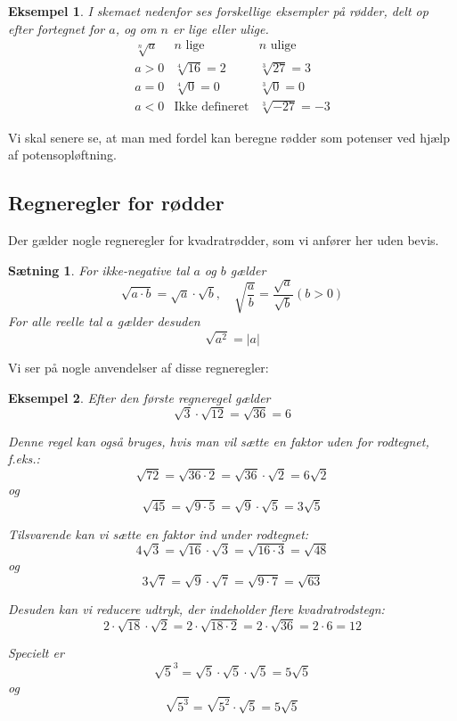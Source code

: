 \documentclass[12pt,oneside,a4paper]{article}
\theoremstyle{plain}
\newtheorem*{thm}{Sætning}
\newtheorem*{eks}{Eksempel}
\begin{document}
\begin{eks}
    I skemaet nedenfor ses forskellige eksempler på rødder, delt op efter
    fortegnet for $a$, og om $n$ er lige eller ulige.
    $$
    \begin{array}{r|c|l}
        \sqrt[n]{a} & \mbox{$n$ lige} & \mbox{$n$ ulige} \\
        \hline
        a > 0 & \sqrt[4]{16} = 2 & \sqrt[3]{27} = 3 \\
        \hline
        a = 0 & \sqrt[4]{0} = 0 & \sqrt[3]{0} = 0 \\
        \hline
        a < 0 & \mbox{Ikke defineret} & \sqrt[3]{-27} = -3
    \end{array}
    $$
\end{eks}

Vi skal senere se, at man med fordel kan beregne rødder som potenser ved hjælp
af potensopløftning.

\subsection*{Regneregler for rødder}
Der gælder nogle regneregler for kvadratrødder, som vi anfører her uden bevis.
\begin{thm}
    For ikke-negative tal $a$ og $b$ gælder
    $$
    \sqrt{a\cdot b} = \sqrt{a} \cdot \sqrt{b}, \quad
    \sqrt{\frac{a}{b}} = \frac{\sqrt{a}}{\sqrt{b}} (b>0)
    $$
    For {\em alle} reelle tal $a$ gælder desuden
    $$
    \sqrt{a^2} = |a|
    $$
\end{thm}

Vi ser på nogle anvendelser af disse regneregler:
\begin{eks}
    Efter den første regneregel gælder
    $$
    \sqrt{3} \cdot \sqrt{12} = \sqrt{36} = 6
    $$
    
    Denne regel kan også bruges, hvis man vil sætte en faktor uden for rodtegnet, f.eks.:
    $$
    \sqrt{72} = \sqrt{36\cdot 2} = \sqrt{36} \cdot \sqrt{2} = 6\sqrt{2}
    $$
    og
    $$
    \sqrt{45} = \sqrt{9\cdot 5} = \sqrt{9} \cdot \sqrt{5} = 3\sqrt{5}
    $$

    Tilsvarende kan vi sætte en faktor ind under rodtegnet:
    $$
    4\sqrt{3} = \sqrt{16} \cdot \sqrt{3} = \sqrt{16\cdot 3} = \sqrt{48}
    $$
    og
    $$
    3\sqrt{7} = \sqrt{9} \cdot \sqrt{7} = \sqrt{9\cdot 7} = \sqrt{63}
    $$

    Desuden kan vi reducere udtryk, der indeholder flere kvadratrodstegn:
    $$
    2\cdot\sqrt{18} \cdot \sqrt{2} = 2\cdot\sqrt{18\cdot 2} = 2\cdot \sqrt{36}
    = 2\cdot 6 = 12
    $$

    Specielt er
    $$
    {\sqrt{5}}^3 = \sqrt{5} \cdot \sqrt{5} \cdot \sqrt{5} = 5\sqrt{5}
    $$
    og
    $$
    \sqrt{5^3} = \sqrt{5^2} \cdot \sqrt{5} = 5\sqrt{5}
    $$

\end{eks}
\end{document}

